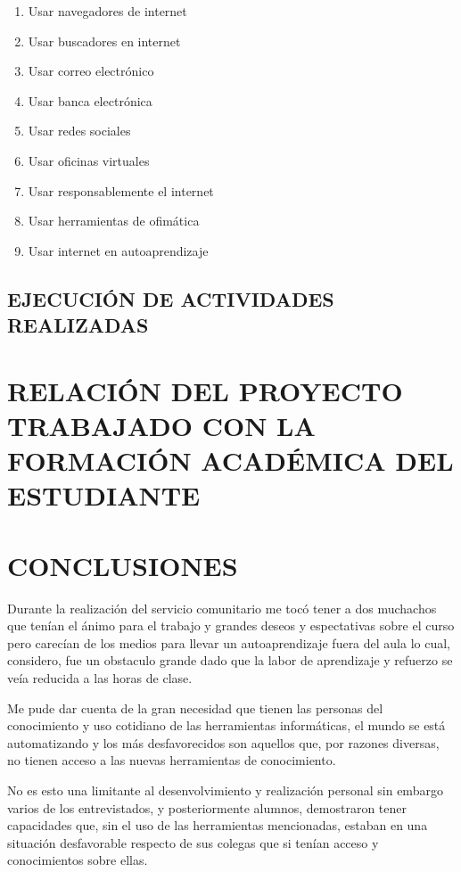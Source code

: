 \documentclass[letterpaper,12pt]{article}
\begin{document}
            \begin{enumerate}
                \item Usar navegadores de internet
                \item Usar buscadores en internet
                \item Usar correo electrónico
                \item Usar banca electrónica
                \item Usar redes sociales
                \item Usar oficinas virtuales
                \item Usar responsablemente el internet
                \item Usar herramientas de ofimática
                \item Usar internet en autoaprendizaje
            \end{enumerate}
        \subsection{EJECUCIÓN DE ACTIVIDADES REALIZADAS}
	\pagebreak
	
	\section{RELACIÓN DEL PROYECTO TRABAJADO CON LA FORMACIÓN ACADÉMICA	DEL\\ ESTUDIANTE}
	\pagebreak
	
	\section{CONCLUSIONES}
    Durante la realización del servicio comunitario me tocó tener a dos muchachos que tenían el ánimo para el trabajo y grandes deseos y espectativas sobre el curso pero carecían de los medios para llevar un autoaprendizaje fuera del aula lo cual, considero,
    fue un obstaculo grande dado que la labor de aprendizaje y refuerzo se veía reducida a las horas de clase.
    
    Me pude dar cuenta de la gran necesidad que tienen las personas del conocimiento y uso cotidiano de las herramientas informáticas, el mundo se está automatizando y los más desfavorecidos son aquellos que, por razones diversas, no tienen acceso a las nuevas herramientas de conocimiento.
    
    No es esto una limitante al desenvolvimiento y realización personal sin embargo varios de los entrevistados, y posteriormente alumnos, demostraron tener capacidades que, sin el uso de las herramientas mencionadas, estaban en una situación desfavorable respecto de sus colegas que si tenían acceso y conocimientos sobre ellas.
    
\end{document}
